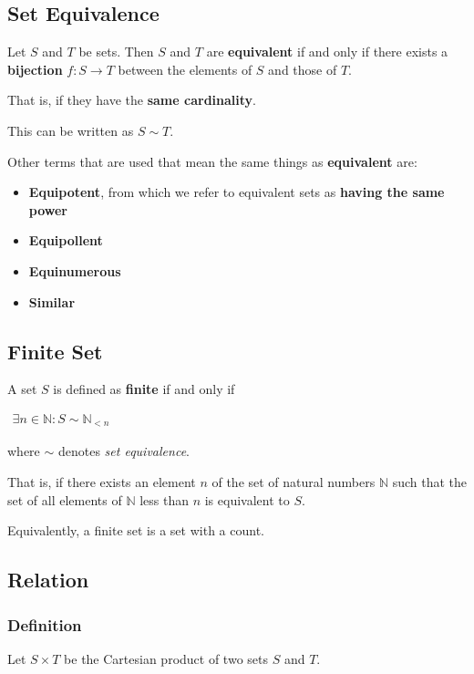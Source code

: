 \subsection{Set Equivalence}

Let $S$ and $T$ be sets. Then $S$ and $T$ are \textbf{equivalent} if
and only if there exists a \textbf{bijection} $f : S \to T$ between
the elements of $S$ and those of $T$.

That is, if they have the \textbf{same cardinality}.

This can be written as $S \sim T$.

Other terms that are used that mean the same things as
\textbf{equivalent} are:

\begin{itemize}
\item \textbf{Equipotent}, from which we refer to equivalent sets as
  \textbf{having the same power}
\item \textbf{Equipollent}
\item \textbf{Equinumerous}
\item \textbf{Similar}
\end{itemize}

\subsection{Finite Set}

A set $S$ is defined as \textbf{finite} if and only if

\begin{math}
  \begin{array}{c}
    \exists n \in \mathbb{N}: S \sim \mathbb{N}_{< n}
  \end{array}
\end{math}

where $\sim$ denotes \textit{set equivalence}.

That is, if there exists an element $n$ of the set of natural numbers
$\mathbb{N}$ such that the set of all elements of $\mathbb{N}$ less
than $n$ is equivalent to $S$.

Equivalently, a finite set is a set with a count.



\subsection{Relation}
\subsubsection{Definition}
Let $S \times T$ be the Cartesian product of two sets $S$ and $T$.

